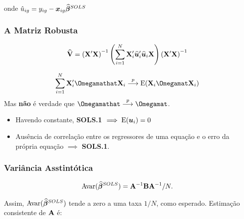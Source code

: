 \documentclass[11pt, oneside, a4paper, article]{article}
\numberwithin{equation}{section}
\begin{document}
\noindent onde $\hat{u}_{ig} = y_{ig} - \boldsymbol{x}_{ig} \widehat{\boldsymbol{\beta}}^{SOLS}$

\subsubsection{A Matriz Robusta}

\vspace{-2 em}
\begin{align*}
	\widehat{\mathbf{V}} =
	\left( \mathbf{X}' \mathbf{X} \right)^{-1}
	\left( \sum_{i=1}^{N} \mathbf{X}_{i}' \widehat{\boldsymbol{u}}_{i}' \widehat{\boldsymbol{u}}_{i} \mathbf{X} \right)
	\left( \mathbf{X}' \mathbf{X} \right)^{-1}
\end{align*}

\vspace{-1 em}
\begin{align*}
	\sum_{i=1}^{N} \Xmat_{i}' \Omegamathat \Xmat_{i} \arrowp 
	\E(\Xmat_{i} \Omegamat \Xmat_{i})
\end{align*}
Mas \textbf{não} é verdade que $\Omegamathat \arrowp \Omegamat$.

\begin{itemize}[noitemsep]
	\item
		Havendo constante, \textbf{SOLS.1} $\implies \text{E}(\boldsymbol{u}_{i})=0$
	\item
		Ausência de correlação entre os regressores de uma equação e o erro da própria equação $\implies$ \textbf{SOLS.1}.
\end{itemize}


\subsubsection{Variância Asstintótica}

\begin{center}
\end{center}

\vspace{-1 em}
\begin{align}\label{eq:avar:sols}
	\text{Avar}(\widehat{\boldsymbol{\beta}}^{SOLS}) = \mathbf{A}^{-1} \mathbf{B} \mathbf{A}^{-1}/N.
\end{align}

Assim, $\text{Avar}(\widehat{\boldsymbol{\beta}}^{SOLS})$ tende a zero a uma taxa $1/N$, como esperado.
Estimação consistente de $\mathbf{A}$ é:
\end{document}
